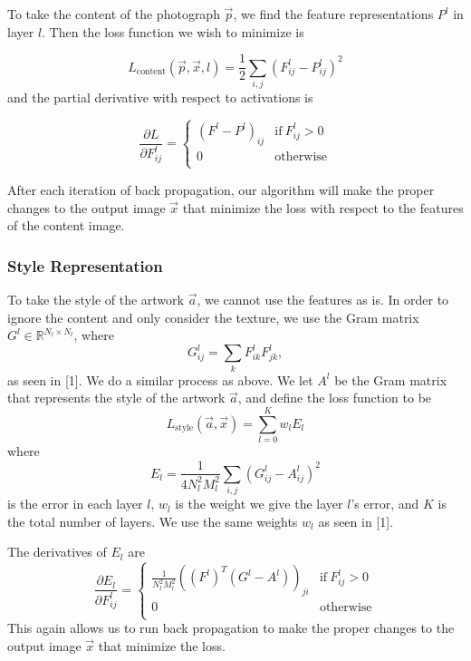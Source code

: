 \documentclass[10pt,twocolumn,letterpaper]{article}
\begin{document}
To take the content of the photograph $\vec{p}$, we find the feature representations $P^l$ in layer $l$. Then the loss function we wish to minimize is

 \[ L_{\text{content}} ( \vec{p}, \vec{x}, l ) = \frac{1}{2} \sum_{i,j} (F_{ij}^l - P_{ij}^l)^2 \]
and the partial derivative with respect to activations is

\[ \frac{ \partial L}{\partial F_{ij}^l} = \left\{
    \begin{array}{ll}
          (F^l - P^l)_{ij} &\text{if} \ F_{ij}^l > 0 \\
         0 & \text{otherwise} \\
    \end{array} 
\right. \]

After each iteration of back propagation, our algorithm will make the proper changes to the output image $\vec{x}$ that minimize the loss with respect to the features of the content image.

\subsubsection{Style Representation}

To take the style of the artwork $\vec{a}$, we cannot use the features as is. In order to ignore the content and only consider the texture, we use the Gram matrix $G^l \in \mathbb{R}^{N_l \times N_l}$, where
\[ G_{ij}^l = \sum_k F_{ik}^l F_{jk}^l , \]
as seen in [1]. We do a similar process as above. We let $A^l$ be the Gram matrix that represents the style of the artwork $\vec{a}$, and define the loss function to be
\[ L_{\text{style}}(\vec{a}, \vec{x}) = \sum_{l = 0}^{K} w_l E_l \]
where
\[ E_l = \frac{1}{4N_l^2 M_l^2} \sum_{i,j} (G_{ij}^l - A_{ij}^l)^2 \]
is the error in each layer $l$, $w_l$ is the weight we give the layer $l$'s error, and $K$ is the total number of layers. We use the same weights $w_l$ as seen in [1].

The derivatives of $E_l$ are
\[ \frac{ \partial E_l}{\partial F_{ij}^l} = \left\{
    \begin{array}{ll}
         \frac{1}{N_l^2 M_l^2} ((F^l)^T (G^l - A^l))_{ji} &\text{if} \ F_{ij}^l > 0 \\
         0 & \text{otherwise} \\
    \end{array} 
\right. \]
This again allows us to run back propagation to make the proper changes to the output image $\vec{x}$ that minimize the loss.
\end{document}
